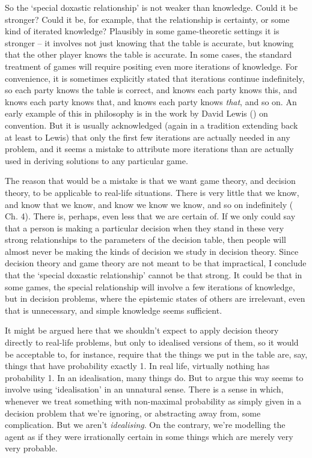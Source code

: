 \documentclass[
  10pt,
  letterpaper,
  DIV=11,
  numbers=noendperiod,
  twoside]{scrartcl}
\begin{document}
So the `special doxastic relationship' is not weaker than knowledge.
Could it be stronger? Could it be, for example, that the relationship is
certainty, or some kind of iterated knowledge? Plausibly in some
game-theoretic settings it is stronger -- it involves not just knowing
that the table is accurate, but knowing that the other player knows the
table is accurate. In some cases, the standard treatment of games will
require positing even more iterations of knowledge. For convenience, it
is sometimes explicitly stated that iterations continue indefinitely, so
each party knows the table is correct, and knows each party knows this,
and knows each party knows that, and knows each party knows \emph{that},
and so on. An early example of this in philosophy is in the work by
David Lewis () on convention. But it is
usually acknowledged (again in a tradition extending back at least to
Lewis) that only the first few iterations are actually needed in any
problem, and it seems a mistake to attribute more iterations than are
actually used in deriving solutions to any particular game.

The reason that would be a mistake is that we want game theory, and
decision theory, to be applicable to real-life situations. There is very
little that we know, and know that we know, and know we know we know,
and so on indefinitely ( Ch. 4). There is, perhaps, even less that we are certain of. If we
only could say that a person is making a particular decision when they
stand in these very strong relationships to the parameters of the
decision table, then people will almost never be making the kinds of
decision we study in decision theory. Since decision theory and game
theory are not meant to be that impractical, I conclude that the
`special doxastic relationship' cannot be that strong. It could be that
in some games, the special relationship will involve a few iterations of
knowledge, but in decision problems, where the epistemic states of
others are irrelevant, even that is unnecessary, and simple knowledge
seems sufficient.

It might be argued here that we shouldn't expect to apply decision
theory directly to real-life problems, but only to idealised versions of
them, so it would be acceptable to, for instance, require that the
things we put in the table are, say, things that have probability
exactly 1. In real life, virtually nothing has probability 1. In an
idealisation, many things do. But to argue this way seems to involve
using `idealisation' in an unnatural sense. There is a sense in which,
whenever we treat something with non-maximal probability as simply given
in a decision problem that we're ignoring, or abstracting away from,
some complication. But we aren't \emph{idealising}. On the contrary,
we're modelling the agent as if they were irrationally certain in some
things which are merely very very probable.
\end{document}
